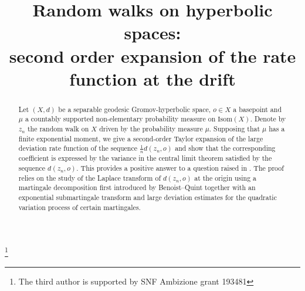 \documentclass[JEP,XML,SOM,Unicode,published]{cedram}
\theoremstyle{plain}
\theoremstyle{definition}
\begin{document}
\frontmatter

\title[Second order expansion of the rate function at the drift]{Random walks on hyperbolic spaces:\\ second order expansion of the rate function at the drift}

\author[\initial{R.} \lastname{Aoun}]{ }
\address{University Gustave Eiffel, Champs-sur-Marne\\
5 boulevard Descartes, Champs-sur-Marne, 77454 Marne-la-Vallée Cedex 2, France}

\author[\initial{P.} \lastname{Mathieu}]{ }
\address{Aix-Marseille Université, CNRS, Centrale Marseille, I2M, UMR 7373\\
13453 Marseille, France}

\author[\initial{C.} \lastname{Sert}]{ }
\address{Institut für Mathematik, Universität Zürich\\
190, Winterthurerstrasse, 8057 Zürich, Switzerland}

\thanks{The third author is supported by SNF Ambizione grant 193481}

\begin{abstract}
Let $(X,d)$ be a separable geodesic Gromov-hyperbolic space, $o \in X$ a basepoint and $\mu$ a countably supported non-elementary probability measure on $\mathrm{Isom}(X)$. Denote by $z_n$ the random walk on $X$ driven by the probability measure $\mu$. Supposing that $\mu$ has a finite exponential moment, we give a second-order Taylor expansion of the large deviation rate function of the sequence $\frac{1}{n}d(z_n,o)$ and show that the corresponding coefficient is expressed by the variance in the central limit theorem satisfied by the sequence $d(z_n,o)$. This provides a positive answer to a question raised in \cite{BMSS}. The proof relies on the study of the Laplace transform of $d(z_n,o)$ at the origin using a martingale decomposition first introduced by Benoist--Quint together with an exponential submartingale transform and large deviation estimates for the quadratic variation process of certain martingales.
\end{abstract}


\end{document}
